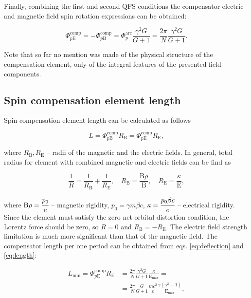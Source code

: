 \documentclass[submitting]{nst}
\begin{document}
 \par Finally, combining the first and second QFS conditions the compensator electric and magnetic field spin rotation expressions can be obtained:

\begin{equation}
	\Phi_{p\mathrm{E}}^{\textrm{comp}} = - \Phi_{p\mathrm{B}}^{\textrm{comp}} = {\Phi}_{p}^{\text{arc}}\frac{\gamma^2 G}{G+1} =\frac{2\pi}{N}\frac{\gamma^2 G}{G+1}.
	\label{eq:deflection}
\end{equation}

\noindent Note that so far no mention was made of the physical structure of the compensation element, only of the integral features of the presented field components.

\subsection{Spin compensation element length}

Spin compensation element length can be calculated as follows

\begin{equation}
	L = \Phi_{p\mathrm{B}}^{\text{comp}}R_{\mathrm{B}} = \Phi_{p\mathrm{E}}^{\text{comp}}R_{\mathrm{E}},
	\label{eq:length}
\end{equation}

\noindent where $R_{\mathrm{B}}, R_{\mathrm{E}}$ -- radii of the magnetic and the electric fields. In general, total radius for element with combined magnetic and electric fields can be find as

\begin{equation}
	\frac{1}{R} = \frac{1}{R_{\mathrm{B}}}+\frac{1}{R_{\mathrm{E}}}, \quad R_{\mathrm{B}}=\frac{\mathrm{B}\rho}{\mathrm{B}}, \quad R_{\mathrm{E}}=\frac{\kappa}{\mathrm{E}},    
	\label{eq:total_radius}
\end{equation}

\noindent where $\mathrm{B}\rho = \cfrac{p_{0}}{e}$ -- magnetic rigidity, $p_{0} = \gamma m\beta c$, $\kappa = \cfrac{p_{0}\beta c}{e}$ -- electrical rigidity. Since the element must satisfy the zero net orbital distortion condition, the Lorentz force should be zero, so $R=0$ and $R_{\mathrm{B}} = -R_{\mathrm{E}}$. The electric field strength limitation is much more significant than that of the magnetic field. The compensator length per one period can be obtained from eqs. \ref{eq:deflection} and \ref{eq:length}:

\begin{equation}
	\begin{aligned}
	L_{\text{min}} = \Phi_{p\mathrm{E}}^{\text{comp}}R_{\mathrm{E}} & = 
	\frac{2\pi}{N}\frac{\gamma^2 G}{G+1}\frac{\kappa}{\mathrm{E}_{\text{max}}} = \\
	& = \frac{2\pi}{N}\frac{G}{G+1}\frac{mc^2}{e}\frac{\gamma(\gamma^2-1)}{\mathrm{E}_{\text{max}}},
	\label{eq:length_min}
	\end{aligned}
\end{equation}
\end{document}
